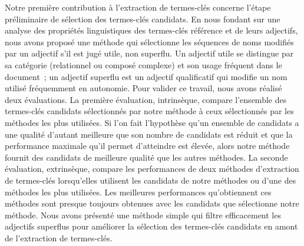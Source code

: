   Notre première contribution à l'extraction de termes-clés concerne l'étape
  préliminaire de sélection des termes-clés candidats. En nous fondant sur une
  analyse des propriétés linguistiques des termes-clés référence et de leurs
  adjectifs, nous avons proposé une méthode qui sélectionne les séquences de
  noms modifiés par un adjectif s'il est jugé utile, non superflu. Un adjectif
  utile se distingue par sa catégorie (relationnel ou composé complexe) et son
  usage fréquent dans le document~; un adjectif superflu est un adjectif
  qualificatif qui modifie un nom utilisé fréquemment en autonomie. Pour valider
  ce travail, nous avons réalisé deux évaluations. La première évaluation,
  intrinsèque, compare l'ensemble des termes-clés candidats sélectionnés par
  notre méthode à ceux sélectionnés par les méthodes les plus utilisées. Si l'on
  fait l'hypothèse qu'un ensemble de candidats a une qualité d'autant meilleure
  que son nombre de candidats est réduit et que la performance maximale qu'il
  permet d'atteindre est élevée, alors notre méthode fournit des candidats de
  meilleure qualité que les autres méthodes. La seconde évaluation, extrinsèque,
  compare les performances de deux méthodes d'extraction de termes-clés
  lorsqu'elles utilisent les candidats de notre méthodes ou d'une des méthodes
  les plus utilisées. Les meilleures performances qu'obtiennent ces méthodes
  sont presque toujours obtenues avec les candidats que sélectionne notre
  méthode. Nous avons présenté une méthode simple qui filtre efficacement les
  adjectifs superflus pour améliorer la sélection des termes-clés candidats en
  amont de l'extraction de termes-clés.

